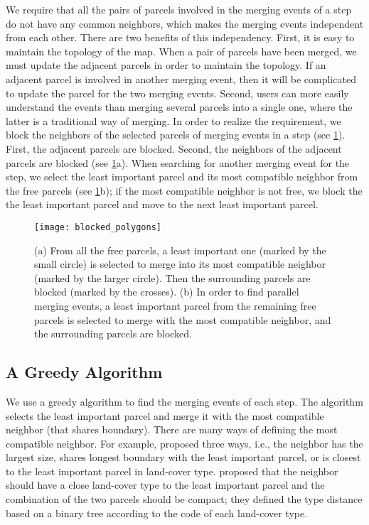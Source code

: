 \documentclass[ijgi,article,submit,moreauthors,pdftex]{Definitions/mdpi}
\begin{document}
We require that 
all the pairs of parcels involved in the merging events of a step 
do not have any common neighbors, 
which makes the merging events independent from each other.
There are two benefits of this independency.
First, it is easy to maintain the topology of the map.
When a pair of parcels have been merged, 
we must update the adjacent parcels in order to maintain the topology.
If an adjacent parcel is involved in another merging event,
then it will be complicated to update the parcel for the two merging events.
Second, users can more easily understand the events 
than merging several parcels into a single one,
where the latter is a traditional way of merging.
In order to realize the requirement, 
we block the neighbors of the selected parcels of merging events in a step
(see \fig\ref{fig:blocked_polygons}).
First, the adjacent parcels are blocked.
Second, the neighbors
of the adjacent parcels are blocked (see \fig\ref{fig:blocked_polygons}a).
When searching for another merging event for the step, 
we select the least important parcel and its most compatible neighbor
from the free parcels (see \fig\ref{fig:blocked_polygons}b);
if the most compatible neighbor is not free,
we block the the least important parcel 
and move to the next least important parcel.

\begin{figure}[tb]
\centering
\texttt{[image: blocked\_polygons]}
\caption{(a) From all the free parcels,
a least important one (marked by the small circle) is selected to merge into
its most compatible neighbor (marked by the larger circle).
Then the surrounding parcels are blocked (marked by the crosses).
(b) In order to find parallel merging events, 
a least important parcel from the remaining free parcels
is selected to merge with the most compatible neighbor,
and the surrounding parcels are blocked.
}
\label{fig:blocked_polygons}
\end{figure}



\subsection{A Greedy Algorithm}
\label{sec:greedy_algo}


We use a greedy algorithm to find the merging events of each step.
The algorithm selects the least important parcel and merge it with
the most compatible neighbor (that shares boundary).
There are many ways of defining the most compatible neighbor.
For example, \citet{Cheng2006} proposed three ways, i.e.,
the neighbor has the largest size, 
shares longest boundary with the least important parcel,
or is closest to the least important parcel in land-cover type. 
\citet{Peng2017AStar} proposed that 
the neighbor should have a close land-cover type
to the least important parcel
and the combination of the two parcels should be compact;
they defined the type distance based on a binary tree
according to the code of each land-cover type.
\end{document}
